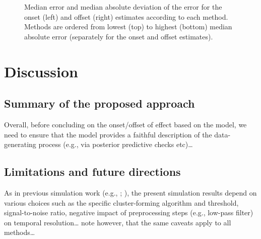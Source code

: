 \documentclass[
  doc,
  floatsintext,
  longtable,
  a4paper,
  nolmodern,
  notxfonts,
  notimes,
  colorlinks=true,linkcolor=blue,citecolor=blue,urlcolor=blue]{apa7}
\begin{document}
\begin{figure}[!htb]

\caption{\label{fig-reliability}Median error and median absolute
deviation of the error for the onset (left) and offset (right) estimates
according to each method. Methods are ordered from lowest (top) to
highest (bottom) median absolute error (separately for the onset and
offset estimates).}


\end{figure}%

\newpage

\section{Discussion}\label{discussion}

\subsection{Summary of the proposed
approach}\label{summary-of-the-proposed-approach}

Overall, before concluding on the onset/offset of effect based on the
model, we need to ensure that the model provides a faithful description
of the data-generating process (e.g., via posterior predictive checks
etc)\ldots{}

\subsection{Limitations and future
directions}\label{limitations-and-future-directions}

As in previous simulation work (e.g.,
;
), the
present simulation results depend on various choices such as the
specific cluster-forming algorithm and threshold, signal-to-noise ratio,
negative impact of preprocessing steps (e.g., low-pass filter) on
temporal resolution\ldots{} note however, that the same caveats apply to
all methods\ldots{}
\end{document}
